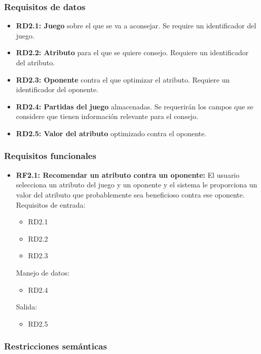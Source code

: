 \subsubsection{Requisitos de datos}

	\begin{itemize}
		\item \textbf{RD2.1: Juego} sobre el que se va a aconsejar.
			Se require un identificador del juego.

		\item \textbf{RD2.2: Atributo} para el que se quiere consejo.
			Requiere un identificador del atributo.

		\item \textbf{RD2.3: Oponente} contra el que optimizar el atributo.
			Requiere un identificador del oponente.

		\item \textbf{RD2.4: Partidas del juego} almacenadas. 
			Se requerirán los campos que se considere que tienen información
			relevante para el consejo.

		\item \textbf{RD2.5: Valor del atributo} optimizado contra el oponente. 

	\end{itemize}


\subsubsection{Requisitos funcionales}

	\begin{itemize}
		\item \textbf{RF2.1: Recomendar un atributo contra un oponente:} 
			El usuario selecciona un atributo del juego y un oponente y el
			sistema le proporciona un valor del atributo que probablemente
			sea beneficioso contra ese oponente.\\

		Requisitos de entrada:
		\begin{itemize}
			\item RD2.1 %
			\item RD2.2 %
			\item RD2.3 %
		\end{itemize}
		Manejo de datos:
		\begin{itemize}
			\item RD2.4 %
		\end{itemize}
		Salida:
		\begin{itemize}
			\item RD2.5 %
		\end{itemize}

	\end{itemize}


\subsubsection{Restricciones semánticas}
